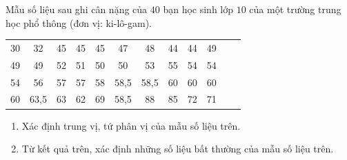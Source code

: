 \begin{bt}%
	Mẫu số liệu sau ghi cân nặng của $40$ bạn học sinh lớp $10$ của một trường trung học phổ thông (đơn vị: ki-lô-gam).
	\begin{center}
		\begin{tabular}{cccccccccccc}
			30&32&45&45&45&47&48&44&44&49 \\
			
			49&49&52&51&50&50&53&55&54&54\\
			
			54&56&57&57&58&58,5&58,5&60&60&60 \\
			60&63,5&63&62&69&58,5&88&85&72&71\\	
		\end{tabular}
	\end{center}
	\begin{enumerate}
		\item Xác định trung vị, tứ phân vị của mẫu số liệu trên.
		\item Từ kết quả trên, xác định những số liệu bất thường của mẫu số liệu trên.
	\end{enumerate}
\end{bt}
